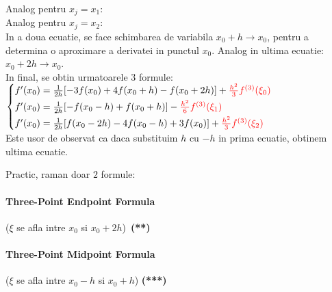 \documentclass{article}
\newenvironment{mdframe16cm}{%
    \begin{mdframed}[nobreak,userdefinedwidth=16cm]
}{%
    \end{mdframed}%
}%
\begin{document}
Analog pentru $x_j=x_1$: \\

Analog pentru $x_j=x_2$: \\

In a doua ecuatie, se face schimbarea de variabila $x_0+h \rightarrow x_0$, pentru a determina o aproximare a derivatei in punctul $x_0$. Analog in ultima ecuatie: $x_0+2h \rightarrow x_0$.\\

In final, se obtin urmatoarele $3$ formule:
$\begin{cases}
    \vspace{0.1cm}f'(x_0) = \frac{1}{2h}[-3f(x_0) + 4f(x_0+h) - f(x_0+2h)] + \textcolor{red}{\frac{h^2}{3}f^{(3)}(\xi_0)} \\
    \vspace{0.1cm}f'(x_0) = \frac{1}{2h}[-f(x_0-h) + f(x_0+h)] - \textcolor{red}{\frac{h^2}{6}f^{(3)}(\xi_1)} \\
    f'(x_0) = \frac{1}{2h}[f(x_0-2h) - 4f(x_0-h) + 3f(x_0)] +\textcolor{red}{\frac{h^2}{3}f^{(3)}(\xi_2)}
\end{cases}$\\

Este usor de observat ca daca substituim $h$ cu $-h$ in prima ecuatie, obtinem ultima ecuatie. \newpage

Practic, raman doar $2$ formule:

\begin{mdframe16cm}\vspace{-0.25cm}
\paragraph{Three-Point Endpoint Formula}

\tabto{0.5cm} ($\xi$ se afla intre $x_0$ si $x_0+2h$)~\textbf{(**)}
\end{mdframe16cm}

\begin{mdframe16cm}\vspace{-0.25cm}
\paragraph{Three-Point Midpoint Formula}
\tabto{0.5cm} ($\xi$ se afla intre $x_0-h$ si $x_0+h$) \textbf{(***)}\\ 
\end{mdframe16cm}
\end{document}
